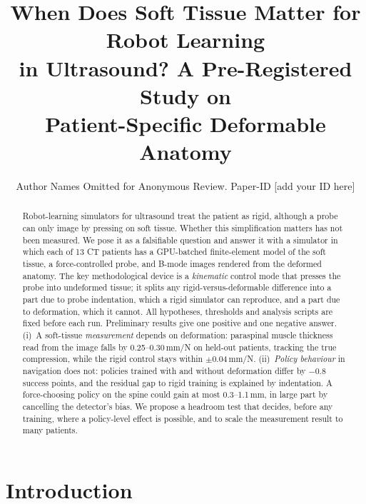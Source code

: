 \documentclass[conference]{IEEEtran}
\begin{document}
\title{When Does Soft Tissue Matter for Robot Learning\\ in Ultrasound? A Pre-Registered Study on\\
Patient-Specific Deformable Anatomy}

\author{Author Names Omitted for Anonymous Review. Paper-ID [add your ID here]}

\maketitle

\begin{abstract}
Robot-learning simulators for ultrasound treat the patient as rigid, although a probe can only image by pressing on
soft tissue. Whether this simplification matters has not been measured. We pose it as a falsifiable question and
answer it with a simulator in which each of 13 CT patients has a GPU-batched finite-element model of the soft tissue,
a force-controlled probe, and B-mode images rendered from the deformed anatomy. The key methodological device is a
\emph{kinematic} control mode that presses the probe into undeformed tissue; it splits any rigid-versus-deformable
difference into a part due to probe indentation, which a rigid simulator can reproduce, and a part due to deformation,
which it cannot. All hypotheses, thresholds and analysis scripts are fixed before each run. Preliminary results give
one positive and one negative answer. (i)~A soft-tissue \emph{measurement} depends on deformation: paraspinal muscle
thickness read from the image falls by 0.25--0.30\,mm/N on held-out patients, tracking the true compression, while
the rigid control stays within $\pm$0.04\,mm/N. (ii)~\emph{Policy behaviour} in navigation does not: policies trained
with and without deformation differ by $-0.8$ success points, and the residual gap to rigid training is explained
by indentation. A force-choosing policy on the spine could gain at most 0.3--1.1\,mm, in large part by cancelling
the detector's bias. We propose a headroom test that decides, before any training, where a policy-level effect is
possible, and to scale the measurement result to many patients.
\end{abstract}

\IEEEpeerreviewmaketitle

\section{Introduction}
\end{document}
